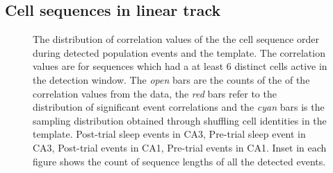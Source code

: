 



\subsection{Cell sequences in linear track}

\begin{figure}[H]
\centering
{}
\caption[Template matching analysis]{The distribution of correlation values of the the cell sequence order during detected population events and the template. The correlation values are for sequences which had a at least 6 distinct cells active in the detection window. The \emph{open} bars are the counts of the of the correlation values from the data, the \emph{red} bars refer to the distribution of significant event correlations and the \emph{cyan} bars is the sampling distribution obtained through shuffling cell identities in the template.  Post-trial sleep events in CA3,   Pre-trial sleep event in CA3,  Post-trial events in CA1,   Pre-trial events in CA1. Inset in each figure shows the count of sequence lengths of all the detected events.}
\label{tmcorr}
\end{figure}

